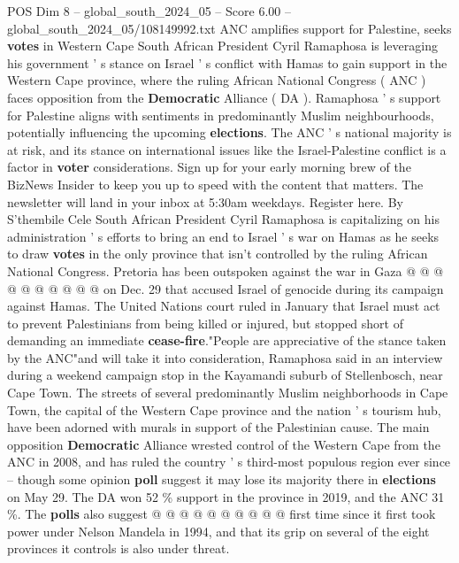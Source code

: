 \begin{textsample}{POS Dim 8 – global\_south\_2024\_05 – Score 6.00 – global\_south\_2024\_05/108149992.txt}  \label{ex:f8_pos_226}
ANC amplifies support for Palestine, seeks \textbf{votes} in Western Cape South African President Cyril Ramaphosa is leveraging his government ' s stance on Israel ' s conflict with Hamas to gain support in the Western Cape province, where the ruling African National Congress ( ANC ) faces opposition from the \textbf{Democratic} Alliance ( DA ).
Ramaphosa ' s support for Palestine aligns with sentiments in predominantly Muslim neighbourhoods, potentially influencing the upcoming \textbf{elections}.
The ANC ' s national majority is at risk, and its stance on international issues like the Israel-Palestine conflict is a factor in \textbf{voter} considerations.
Sign up for your early morning brew of the BizNews Insider to keep you up to speed with the content that matters.
The newsletter will land in your inbox at 5:30am weekdays.
Register here.
By S'thembile Cele South African President Cyril Ramaphosa is capitalizing on his administration ' s efforts to bring an end to Israel ' s war on Hamas as he seeks to draw \textbf{votes} in the only province that isn't controlled by the ruling African National Congress.
Pretoria has been outspoken against the war in Gaza @ @ @ @ @ @ @ @ @ @ on Dec. 29 that accused Israel of genocide during its campaign against Hamas.
The United Nations court ruled in January that Israel must act to prevent Palestinians from being killed or injured, but stopped short of demanding an immediate \textbf{cease-fire}."People are appreciative of the stance taken by the ANC"and will take it into consideration, Ramaphosa said in an interview during a weekend campaign stop in the Kayamandi suburb of Stellenbosch, near Cape Town.
The streets of several predominantly Muslim neighborhoods in Cape Town, the capital of the Western Cape province and the nation ' s tourism hub, have been adorned with murals in support of the Palestinian cause.
The main opposition \textbf{Democratic} Alliance wrested control of the Western Cape from the ANC in 2008, and has ruled the country ' s third-most populous region ever since -- though some opinion \textbf{poll} suggest it may lose its majority there in \textbf{elections} on May 29.
The DA won 52 \% support in the province in 2019, and the ANC 31 \%.
The \textbf{polls} also suggest @ @ @ @ @ @ @ @ @ @ first time since it first took power under Nelson Mandela in 1994, and that its grip on several of the eight provinces it controls is also under threat.

\end{textsample}
